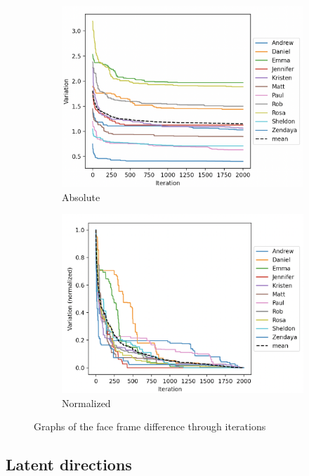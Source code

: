 \documentclass[review]{elsarticle}
\begin{document}
\begin{figure}[H]

\begin{subfigure}{0.49\textwidth}
\includegraphics[width=0.9\linewidth]{Images/absolute.png} 
\caption{Absolute}
\label{fig:absolute}
\end{subfigure}
\begin{subfigure}{0.49\textwidth}
\includegraphics[width=0.9\linewidth]{Images/normalized.png}
\caption{Normalized}
\label{fig:normalized}
\end{subfigure}

\caption{Graphs of the face frame difference through iterations}
\label{fig:variation_iterations}
\end{figure}

\subsection{Latent directions}
\end{document}
